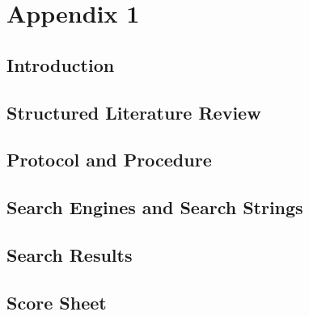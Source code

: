 
\chapter{Appendix 1}
\label{appendix:slrreport}
\section{Introduction}


\section{Structured Literature Review}


\section{Protocol and Procedure}


\section{Search Engines and Search Strings}


\section{Search Results}


\section{Score Sheet}


\clearpage

